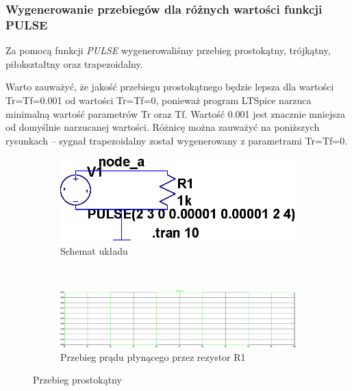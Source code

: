 \documentclass[polish,polish,a4paper]{article}
\begin{document}
\subsubsection{Wygenerowanie przebiegów dla różnych wartości funkcji PULSE}
Za pomocą funkcji \emph{PULSE} wygenerowaliśmy przebieg prostokątny, trójkątny, piłokształtny oraz trapezoidalny.

Warto zauważyć, że jakość przebiegu prostokątnego będzie lepsza dla wartości Tr=Tf=0.001 od wartości Tr=Tf=0, ponieważ program LTSpice narzuca minimalną wartość parametrów Tr oraz Tf. Wartość 0.001 jest znacznie mniejsza od domyślnie narzucanej wartości. Różnicę można zauważyć na poniższych rysunkach -- sygnał trapezoidalny został wygenerowany z parametrami Tr=Tf=0.

\begin{figure}[H]
    \centering
    
    \begin{subfigure}[b]{0.4\textwidth}
    	\centering
        \includegraphics[width=\textwidth]{02uklad.eps}
        \caption{Schemat układu}
    \end{subfigure}
    ~
     \begin{subfigure}[b]{0.4\textwidth}
     	\centering
         \includegraphics[width=\textwidth]{Draft2.eps}
         \caption{Przebieg prądu płynącego przez rezystor R1}
     \end{subfigure}
     \caption{Przebieg prostokątny}
\end{figure}
\end{document}
